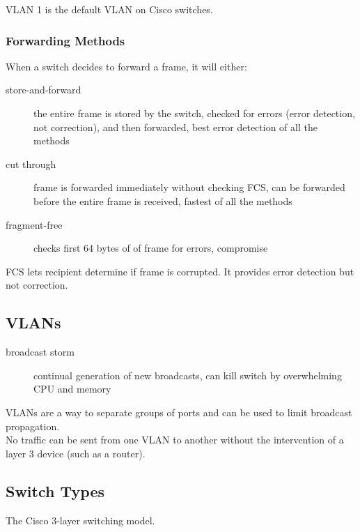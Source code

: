 VLAN 1 is the default VLAN on Cisco switches.

\subsubsection{Forwarding Methods}

When a switch decides to forward a frame, it will either:

\begin{description}

\item[store-and-forward]
the entire frame is stored by the switch, checked for errors (error detection,
not correction), and then forwarded, best error detection of all the methods

\item[cut through]
frame is forwarded immediately without checking FCS, can be forwarded before
the entire frame is received, fastest of all the methods

\item[fragment-free]
checks first 64 bytes of of frame for errors, compromise


\end{description}

FCS lets recipient determine if frame is corrupted. It provides error
detection but not correction.

\subsection{VLANs}

\begin{description}

\item[broadcast storm]
continual generation of new broadcasts, can kill switch by overwhelming
CPU and memory

\end{description}

VLANs are a way to separate groups of ports and can be used to limit broadcast
propagation.\\

No traffic can be sent from one VLAN to another without the intervention of
a layer 3 device (such as a router).

\subsection{Switch Types}

The Cisco 3-layer switching model.

